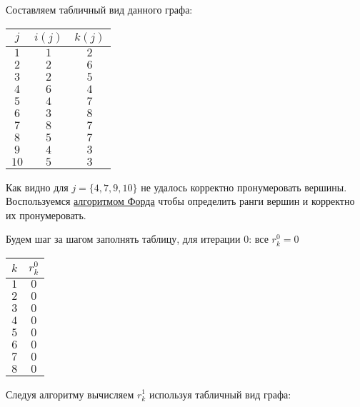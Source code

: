 Составляем табличный вид данного графа:

\begin{table}[H]
	\centering
	\begin{tabular}{ | c | c | c | } 
		\hline
		$j$ & $i(j)$ & $k(j)$ \\ \hline
		
		$1$ & $1$ & $2$ \\ \hline
		$2$ & $2$ & $6$ \\ \hline
		$3$ & $2$ & $5$ \\ \hline
		$4$ & $6$ & $4$ \\ \hline
		$5$ & $4$ & $7$ \\ \hline
		$6$ & $3$ & $8$ \\ \hline
		$7$ & $8$ & $7$ \\ \hline
		$8$ & $5$ & $7$ \\ \hline
		$9$ & $4$ & $3$ \\ \hline
		$10$ & $5$ & $3$ \\ \hline
	\end{tabular}
\end{table}

Как видно для $j = \{4, 7, 9, 10\}$ не удалось корректно пронумеровать вершины. Воспользуемся \hyperref[alg:ford]{алгоритмом Форда} чтобы определить ранги вершин и корректно их пронумеровать.

Будем шаг за шагом заполнять таблицу, для итерации 0: все $r_k^0 = 0$

\begin{table}[H]
	\centering
	\begin{tabular}{ | c | c | } 
		\hline
		$k$ & $r_k^0$ \\ \hline
		$1$ & $0$ \\ \hline
		$2$ & $0$ \\ \hline
		$3$ & $0$ \\ \hline
		$4$ & $0$ \\ \hline
		$5$ & $0$ \\ \hline
		$6$ & $0$ \\ \hline
		$7$ & $0$ \\ \hline
		$8$ & $0$ \\ \hline
	\end{tabular}
\end{table}


\bigskip

Следуя алгоритму вычисляем $r^1_k$ используя табличный вид графа:

